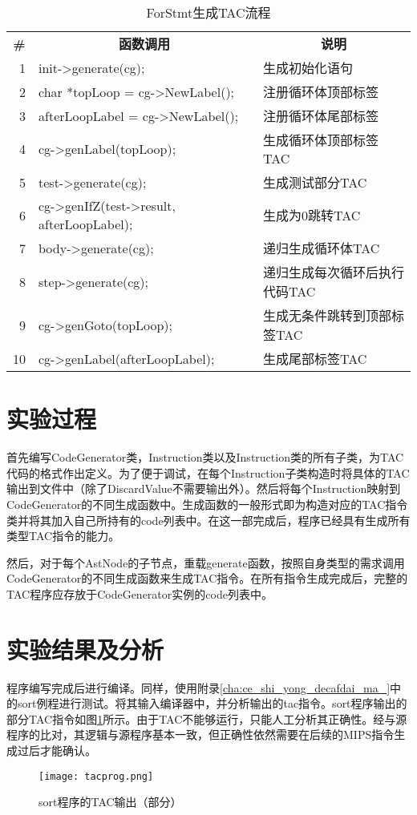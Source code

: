 \begin{table}[htpb]
    \centering
    \caption{ForStmt生成TAC流程}
    \label{tab:forstmt}
    \begin{tabular}{r l l}
        \toprule
        \multicolumn{1}{c}{\textbf{\#}} &
        \multicolumn{1}{c}{\textbf{函数调用}} &
        \multicolumn{1}{c}{\textbf{说明}} \\
        \cmidrule(lr){1-1} \cmidrule(lr){2-2} \cmidrule(lr){3-3}
        1  & init->generate(cg); & 生成初始化语句\\
        2  & char *topLoop = cg->NewLabel(); & 注册循环体顶部标签\\
        3  & afterLoopLabel = cg->NewLabel(); & 注册循环体尾部标签\\
        4  & cg->genLabel(topLoop); & 生成循环体顶部标签TAC\\
        5  & test->generate(cg); & 生成测试部分TAC\\
        6  & cg->genIfZ(test->result, afterLoopLabel); & 生成为0跳转TAC\\
        7  & body->generate(cg); & 递归生成循环体TAC\\
        8  & step->generate(cg); & 递归生成每次循环后执行代码TAC\\
        9  & cg->genGoto(topLoop); & 生成无条件跳转到顶部标签TAC\\
        10 & cg->genLabel(afterLoopLabel); & 生成尾部标签TAC \\
        \bottomrule
    \end{tabular}
\end{table}

\section{实验过程}
\label{sec:shi_yan_bu_zou_3}
\par 首先编写CodeGenerator类，Instruction类以及Instruction类的所有子类，为TAC代码的格式作出定义。为了便于调试，在每个Instruction子类构造时将具体的TAC输出到文件中（除了DiscardValue不需要输出外）。然后将每个Instruction映射到CodeGenerator的不同生成函数中。生成函数的一般形式即为构造对应的TAC指令类并将其加入自己所持有的code列表中。在这一部完成后，程序已经具有生成所有类型TAC指令的能力。
\par 然后，对于每个AstNode的子节点，重载generate函数，按照自身类型的需求调用CodeGenerator的不同生成函数来生成TAC指令。在所有指令生成完成后，完整的TAC程序应存放于CodeGenerator实例的code列表中。

\section{实验结果及分析}
\label{sec:shi_yan_jie_guo_ji_fen_xi_3}
\par 程序编写完成后进行编译。同样，使用附录\ref{cha:ce_shi_yong_decafdai_ma_}中的sort例程进行测试。将其输入编译器中，并分析输出的tac指令。sort程序输出的部分TAC指令如图\ref{fig:tacprog}所示。由于TAC不能够运行，只能人工分析其正确性。经与源程序的比对，其逻辑与源程序基本一致，但正确性依然需要在后续的MIPS指令生成过后才能确认。

\begin{figure}[htpb]
    \centering
    \texttt{[image: tacprog.png]}
    \caption{sort程序的TAC输出（部分）}
    \label{fig:tacprog}
\end{figure}


